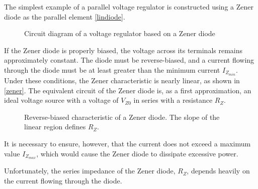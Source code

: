 \documentclass[../main.tex]{subfiles}
\begin{document}
The simplest example of a parallel voltage regulator is constructed using a Zener diode as the parallel element \autoref{lindiode}.


\begin{figure}[h!]
\begin{center}

\label{lindiode}
\caption{Circuit diagram of a voltage regulator based on a Zener diode}	
\end{center}	
\end{figure}




If the Zener diode is properly biased, the voltage across its terminals remains approximately constant. 
The diode must be reverse-biased, and a current flowing through the diode must be at least greater than the minimum current $I_{Z_{min}}$. Under these conditions, the Zener characteristic is nearly linear, as shown in \autoref{zener}. 
The equivalent circuit of the Zener diode is, as a first approximation, an ideal voltage source with a voltage of $V_{Z0}$ in series with a resistance $R_Z$.

\begin{figure}[h!]
\begin{center}




\label{zener}
\caption{Reverse-biased characteristic of a Zener diode. The slope of the linear region defines $R_Z$.}	
\end{center}	
\end{figure} 

It is necessary to ensure, however, that the current does not exceed a maximum value $I_{Z_{max}}$, which would cause the Zener diode to dissipate excessive power.

Unfortunately, the series impedance of the Zener diode, $R_Z$, depends heavily on the current flowing through the diode. 
\end{document}
